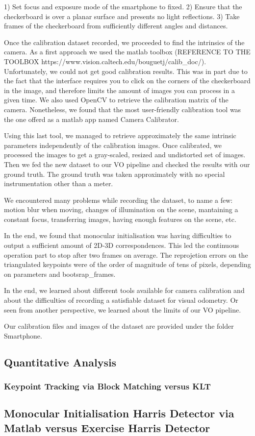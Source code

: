 1) Set focus and exposure mode of the smartphone to fixed.
2) Ensure that the checkerboard is over a planar surface and presents no light reflections.
3) Take frames of the checkerboard from sufficiently different angles and distances.

Once the calibration dataset recorded, we proceeded to find the intrinsics of the camera.
As a first approach we used the matlab toolbox (REFERENCE TO THE TOOLBOX https://www.vision.caltech.edu/bouguetj/calib_doc/).
Unfortunately, we could not get good calibration results.
This was in part due to the fact that the interface requires you to click on the
corners of the checkerboard in the image, and therefore limits the amount of images you can process in a given time.
We also used OpenCV to retrieve the calibration matrix of the camera. Nonetheless, we found that the most user-friendly
calibration tool was the one offerd as a matlab app named Camera Calibrator.

Using this last tool, we managed to retrieve approximately the same intrinsic parameters independently of the calibration images.
Once calibrated, we processed the images to get a gray-scaled, resized and undistorted set of images. Then we fed the new
dataset to our VO pipeline and checked the results with our ground truth.
The ground truth was taken approximately with no special instrumentation other than a meter.

We encountered many problems while recording the dataset, to name a few: motion blur when moving, changes of illumination on the scene,
mantaining a constant focus, transferring images, having enough features on the scene, etc.

In the end, we found that monocular initialisation was having difficulties to output a sufficient amount of 2D-3D correspondences.
This led the continuous operation part to stop after two frames on average. The reprojetion errors on the triangulated keypoints were of
the order of magnitude of tens of pixels, depending on parameters and bootsrap_frames.

In the end, we learned about different tools available for camera calibration and about the difficulties of recording a satisfiable dataset
for visual odometry. Or seen from another perspective, we learned about the limits of our VO pipeline.

Our calibration files and images of the dataset are provided under the folder Smartphone.








\subsection{Quantitative Analysis}
\subsubsection{Keypoint Tracking via Block Matching versus KLT}

\subsection{Monocular Initialisation Harris Detector via Matlab versus Exercise Harris Detector}
